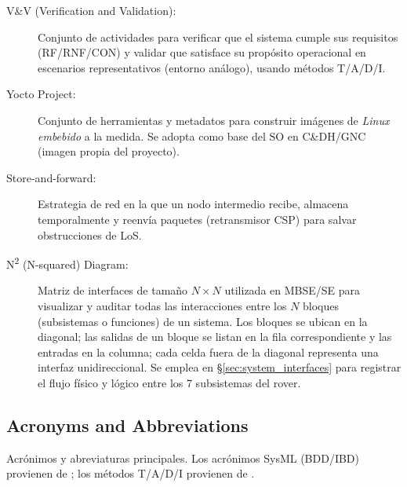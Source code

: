 \begin{description}
    \item[V\&V (Verification and Validation):] Conjunto de actividades para verificar que el sistema cumple sus requisitos (RF/RNF/CON) y validar que satisface su propósito operacional en escenarios representativos (entorno análogo), usando métodos T/A/D/I. \cite{ieee_29148}
    \item[Yocto Project:] Conjunto de herramientas y metadatos para construir imágenes de \emph{Linux embebido} a la medida. Se adopta como base del SO en C\&DH/GNC (imagen propia del proyecto).
    \item[Store-and-forward:] Estrategia de red en la que un nodo intermedio recibe, almacena temporalmente y reenvía paquetes (retransmisor CSP) para salvar obstrucciones de LoS.
    \item[N\textsuperscript{2} (N-squared) Diagram:] Matriz de interfaces de tamaño $N \times N$ utilizada en MBSE/SE para visualizar y auditar todas las interacciones entre los $N$ bloques (subsistemas o funciones) de un sistema. Los bloques se ubican en la diagonal; las salidas de un bloque se listan en la fila correspondiente y las entradas en la columna; cada celda fuera de la diagonal representa una interfaz unidireccional. Se emplea en \S\ref{sec:system_interfaces} para registrar el flujo físico y lógico entre los 7 subsistemas del rover. \cite{nasa_se_handbook}
\end{description}

\subsection{Acronyms and Abbreviations}

Acrónimos y abreviaturas principales. Los acrónimos SysML (BDD/IBD) provienen de \cite{omg_sysml_mbse}; los métodos T/A/D/I provienen de \cite{ieee_29148}.


